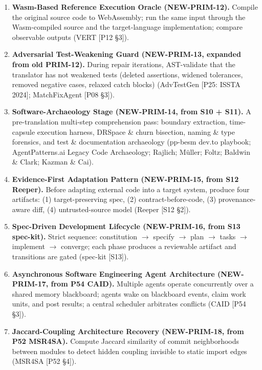 \begin{enumerate}
\item \textbf{Wasm-Based Reference Execution Oracle (NEW-PRIM-12).}
Compile the original source code to WebAssembly; run the same input through the Wasm-compiled source and the target-language implementation; compare observable outputs (VERT [P12 \S3]).

\item \textbf{Adversarial Test-Weakening Guard (NEW-PRIM-13, expanded from old PRIM-12).}
During repair iterations, AST-validate that the translator has not weakened tests (deleted assertions, widened tolerances, removed negative cases, relaxed catch blocks) (AdvTestGen [P25: ISSTA 2024]; MatchFixAgent [P08 \S3]).

\item \textbf{Software-Archaeology Stage (NEW-PRIM-14, from S10 + S11).}
A pre-translation multi-step comprehension pass: boundary extraction, time-capsule execution harness, DRSpace \& churn bisection, naming \& type forensics, and test \& documentation archaeology (pp-besm dev.to playbook; AgentPatterns.ai Legacy Code Archaeology; Rajlich; M\"uller; Foltz; Baldwin \& Clark; Kazman \& Cai).

\item \textbf{Evidence-First Adaptation Pattern (NEW-PRIM-15, from S12 Reeper).}
Before adapting external code into a target system, produce four artifacts: (1) target-preserving spec, (2) contract-before-code, (3) provenance-aware diff, (4) untrusted-source model (Reeper [S12 \S2]).

\item \textbf{Spec-Driven Development Lifecycle (NEW-PRIM-16, from S13 spec-kit).}
Strict sequence: constitution $\rightarrow$ specify $\rightarrow$ plan $\rightarrow$ tasks $\rightarrow$ implement $\rightarrow$ converge; each phase produces a reviewable artifact and transitions are gated (spec-kit [S13]).

\item \textbf{Asynchronous Software Engineering Agent Architecture (NEW-PRIM-17, from P54 CAID).}
Multiple agents operate concurrently over a shared memory blackboard; agents wake on blackboard events, claim work units, and post results; a central scheduler arbitrates conflicts (CAID [P54 \S3]).

\item \textbf{Jaccard-Coupling Architecture Recovery (NEW-PRIM-18, from P52 MSR4SA).}
Compute Jaccard similarity of commit neighborhoods between modules to detect hidden coupling invisible to static import edges (MSR4SA [P52 \S4]).


\end{enumerate}
